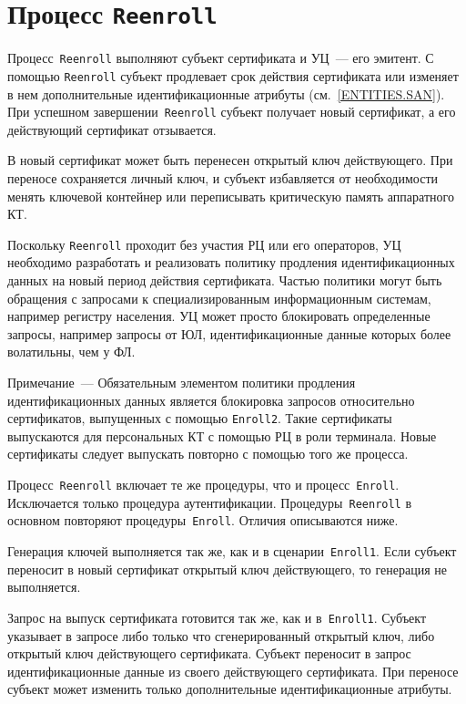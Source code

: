 \section{Процесс \texttt{Reenroll}}\label{PROCESSES.Reenroll}

Процесс~\texttt{Reenroll} выполняют субъект сертификата и УЦ~--- 
его эмитент. С помощью \texttt{Reenroll} субъект продлевает 
срок действия сертификата или изменяет в нем дополнительные
идентификационные атрибуты (см.~\ref{ENTITIES.SAN}).
%
При успешном завершении~\texttt{Reenroll} субъект получает новый 
сертификат, а его действующий сертификат отзывается. 

В новый сертификат может быть перенесен открытый ключ
действующего. При переносе сохраняется личный ключ,
и субъект избавляется от необходимости менять ключевой
контейнер или переписывать критическую память аппаратного КТ.

Поскольку \texttt{Reenroll} проходит без участия РЦ или его операторов,
УЦ необходимо разработать и реализовать политику продления 
идентификационных данных на новый период действия сертификата.
%
Частью политики могут быть обращения с запросами к специализированным 
информационным системам, например регистру населения.
%
УЦ может просто блокировать определенные запросы, например запросы от 
ЮЛ, идентификационные данные которых более волатильны, чем у ФЛ.

\begin{note}
Примечание~---
Обязательным элементом политики продления идентификационных данных
является блокировка запросов относительно сертификатов, выпущенных с 
помощью \texttt{Enroll2}. Такие сертификаты выпускаются для персональных 
КТ с помощью РЦ в роли терминала. Новые сертификаты следует выпускать 
повторно с помощью того же процесса.
\end{note}

Процесс~\texttt{Reenroll} включает те же процедуры, 
что и процесс~\texttt{Enroll}. Исключается только процедура 
аутентификации. Процедуры~\texttt{Reenroll} в основном повторяют 
процедуры~\texttt{Enroll}. Отличия описываются ниже.

Генерация ключей выполняется так же, как и в сценарии~\texttt{Enroll1}. 
Если субъект переносит в новый сертификат открытый ключ действующего, то 
генерация не выполняется. 

Запрос на выпуск сертификата готовится так же, как и в~\texttt{Enroll1}.
%
Субъект указывает в запросе либо только что сгенерированный открытый ключ,
либо открытый ключ действующего сертификата.
%
Субъект переносит в запрос идентификационные данные из своего действующего 
сертификата. При переносе субъект может изменить только дополнительные 
идентификационные атрибуты. 

